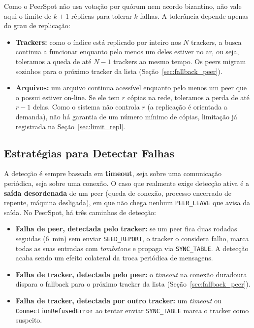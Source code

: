 \documentclass[12pt, a4paper]{article}
\begin{document}
Como o PeerSpot não usa votação por quórum nem acordo bizantino, não vale aqui o limite de $k+1$ réplicas para tolerar $k$ falhas. A tolerância depende apenas do grau de replicação:

\begin{itemize}
    \item \textbf{Trackers:} como o índice está replicado por inteiro nos $N$ trackers, a busca continua a funcionar enquanto pelo menos um deles estiver no ar, ou seja, toleramos a queda de até $N-1$ trackers ao mesmo tempo. Os peers migram sozinhos para o próximo tracker da lista (Seção~\ref{sec:fallback_peer}).
    \item \textbf{Arquivos:} um arquivo continua acessível enquanto pelo menos um peer que o possui estiver on-line. Se ele tem $r$ cópias na rede, toleramos a perda de até $r-1$ delas. Como o sistema não controla $r$ (a replicação é orientada a demanda), não há garantia de um número mínimo de cópias, limitação já registrada na Seção~\ref{sec:limit_repl}.
\end{itemize}

\subsection{Estratégias para Detectar Falhas}\label{sec:detec-falha}

A detecção é sempre baseada em \textbf{timeout}, seja sobre uma comunicação periódica, seja sobre uma conexão. O caso que realmente exige detecção ativa é a \textbf{saída desordenada} de um peer (queda de conexão, processo encerrado de repente, máquina desligada), em que não chega nenhum \texttt{PEER\_LEAVE} que avisa da saída. No PeerSpot, há três caminhos de detecção:

\begin{itemize}
    \item \textbf{Falha de peer, detectada pelo tracker:} se um peer fica duas rodadas seguidas (6~min) sem enviar \texttt{SEED\_REPORT}, o tracker o considera falho, marca todas as suas entradas com \textit{tombstone} e propaga via \texttt{SYNC\_TABLE}. A detecção acaba sendo um efeito colateral da troca periódica de mensagens.
    \item \textbf{Falha de tracker, detectada pelo peer:} o \textit{timeout} na conexão duradoura dispara o fallback para o próximo tracker da lista (Seção~\ref{sec:fallback_peer}).
    \item \textbf{Falha de tracker, detectada por outro tracker:} um \textit{timeout} ou \texttt{ConnectionRefusedError} ao tentar enviar \texttt{SYNC\_TABLE} marca o tracker como suspeito.
\end{itemize}
\end{document}
